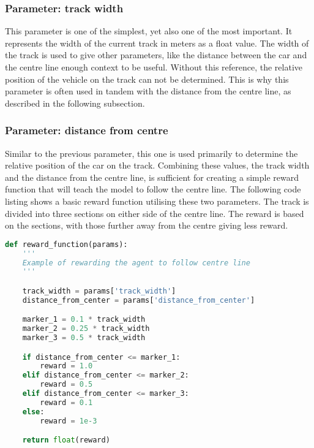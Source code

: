 \subsubsection{Parameter: track width}
This parameter is one of the simplest, yet also one of the most important. It represents the width of the current track in meters as a float value. The width of the track is used to give other parameters, like the distance between the car and the centre line enough context to be useful. Without this reference, the relative position of the vehicle on the track can not be determined. This is why this parameter is often used in tandem with the distance from the centre line, as described in the following subsection.

\subsubsection{Parameter: distance from centre}
Similar to the previous parameter, this one is used primarily to determine the relative position of the car on the track. Combining these values, the track width and the distance from the centre line, is sufficient for creating a simple reward function that will teach the model to follow the centre line. The following code listing shows a basic reward function utilising these two parameters. The track is divided into three sections on either side of the centre line. The reward is based on the sections, with those further away from the centre giving less reward.

\begin{minipage}{\linewidth}
\begin{lstlisting}[language={Python},label={lst:reward_distance}, caption={Reward function using track width and distance from centre}]
def reward_function(params):
    '''
    Example of rewarding the agent to follow centre line
    '''

    track_width = params['track_width']
    distance_from_center = params['distance_from_center']

    marker_1 = 0.1 * track_width
    marker_2 = 0.25 * track_width
    marker_3 = 0.5 * track_width

    if distance_from_center <= marker_1:
        reward = 1.0
    elif distance_from_center <= marker_2:
        reward = 0.5
    elif distance_from_center <= marker_3:
        reward = 0.1
    else:
        reward = 1e-3

    return float(reward)
\end{lstlisting}
\end{minipage}

